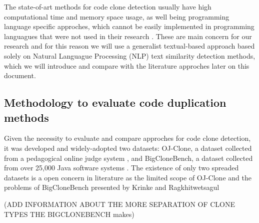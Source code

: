 The state-of-art methods for code clone detection usually have high computational time and memory space usage, as well being
programming language specific approches, which cannot be easily implemented in programming languagues that were not used in 
their research \citep{litreview}. These are main concern for our research and for this reason we will use a generalist textual-based 
approach based solely on Natural Languague Processing (NLP) text similarity detection methods, which we will introduce and compare
with the literature approches later on this document. 

\subsection{Methodology to evaluate code duplication methods}

\label{subsec:codumethods}

Given the necessity to evaluate and compare approches for code clone detection, it was developed and widely-adopted two datasets: 
OJ-Clone, a dataset collected from a pedagogical online judge system \citep{ojclone}, and BigCloneBench, a dataset collected from over 
25,000 Java software systems \citep{bigclonebench}. The existence of only two spreaded datasets is a open concern in literature as 
the limited scope of OJ-Clone and the problems of BigCloneBench presented by Krinke and Ragkhitwetsagul \citep{bigfail}

(ADD INFORMATION ABOUT THE MORE SEPARATION OF CLONE TYPES THE BIGCLONEBENCH makes)











